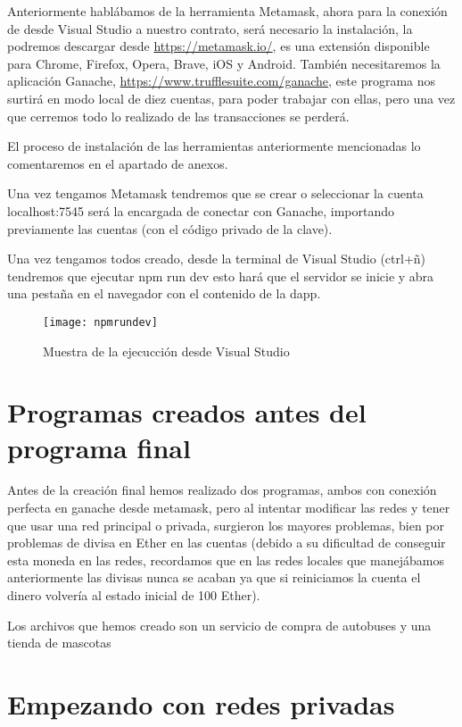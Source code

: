 Anteriormente hablábamos de la herramienta Metamask, ahora para la conexión de desde Visual Studio a nuestro contrato, será necesario la instalación, la podremos descargar desde \url{https://metamask.io/}, es una extensión disponible para Chrome, Firefox, Opera, Brave, iOS y Android. También necesitaremos la aplicación Ganache, \url{https://www.trufflesuite.com/ganache}, este programa nos surtirá en modo local de diez cuentas, para poder trabajar con ellas, pero una vez que cerremos todo lo realizado de las transacciones se perderá.

El proceso de instalación de las herramientas anteriormente mencionadas lo comentaremos en el apartado de anexos.

Una vez tengamos Metamask tendremos que se crear o seleccionar la cuenta localhost:7545 será la encargada de conectar con Ganache, importando previamente las cuentas (con el código privado de la clave). 

Una vez tengamos todos creado, desde la terminal de Visual Studio (ctrl+ñ) tendremos que ejecutar npm run dev esto hará que el servidor se inicie y abra una pestaña en el navegador con el contenido de la dapp.

\begin{figure}[h]
  \centering
  \texttt{[image: npmrundev]}
  \caption{Muestra de la ejecucción desde Visual Studio}
\end{figure}  

\section{Programas creados antes del programa final}

Antes de la creación final hemos realizado dos programas, ambos con conexión perfecta en ganache desde metamask, pero al intentar modificar las redes y tener que usar una red principal o privada, surgieron los mayores problemas, bien por problemas de divisa en Ether en las cuentas (debido a su dificultad de conseguir esta moneda en las redes, recordamos que en las redes locales que manejábamos anteriormente las divisas nunca se acaban ya que si reiniciamos la cuenta el dinero volvería al estado inicial de 100 Ether).

Los archivos que hemos creado son un servicio de compra de autobuses y una tienda de mascotas

\section{Empezando con redes privadas}

